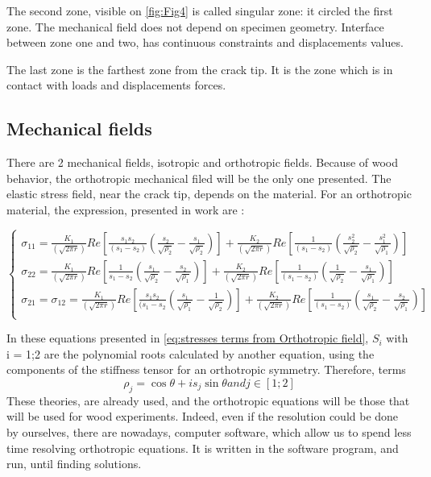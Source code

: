 The second zone, visible on \ref{fig:Fig4} is called singular zone: it circled the first zone. The mechanical field does not depend on specimen geometry. Interface between zone one and two, has continuous constraints and displacements values.

The last zone is the farthest zone from the crack tip. It is the zone which is in contact with loads and displacements forces.

\subsection{Mechanical fields}
There are 2 mechanical fields, isotropic and orthotropic fields. Because of wood behavior, the orthotropic mechanical filed will be the only one presented. 
The elastic stress field, near the crack tip, depends on the material. For an orthotropic material, the expression, presented in \parencite{Reference10} work are :

\begin{equation}
	\left\{
	\begin{array}{rcr}
		\sigma_{11}=\frac{K_{1}}{(\sqrt{2 \pi r})}Re[\frac{s_{1}s_{2}}{(s_{1}-s_{2})}(\frac{s_{2}}{\sqrt{\rho_{2}}}-\frac{s_{1}}{\sqrt{\rho_{2}}})]+\frac{K_{2}}{(\sqrt{2 \pi r})}Re[\frac{1}{(s_{1}-s_{2})}(\frac{s_{2}^{2}}{\sqrt{\rho_{2}}}-\frac{s_{1}^{2}}{\sqrt{\rho_{1}}})]\\
		\sigma_{22}=\frac{K_{1}}{(\sqrt{2 \pi r})}Re[\frac{1}{s_{1}-s_{2}}(\frac{s_{1}}{\sqrt{\rho_{2}}}-\frac{s_{2}}{\sqrt{\rho_{1}}})]+\frac{K_{2}}{(\sqrt{2 \pi r})}Re[\frac{1}{(s_{1}-s_{2})}(\frac{1}{\sqrt{\rho_{2}}}-\frac{s_{1}}{\sqrt{\rho_{1}}})]\\
		\sigma_{21}=\sigma_{12}=\frac{K_{1}}{(\sqrt{2 \pi r})}Re[\frac{s_{1}s_{2}}{(s_{1}-s_{2}}(\frac{s_{1}}{\sqrt{\rho_{1}}}-\frac{1}{\sqrt{\rho_{2}}})]+\frac{K_{2}}{(\sqrt{ 2\pi r})}Re[\frac{1}{(s_{1}-s_{2})}(\frac{s_{1}}{\sqrt{\rho_{2}}}-\frac{s_{2}}{\sqrt{\rho_{1}}})] \\
	\end{array}
	\right.			
	\label{eq:stresses terms from Orthotropic field}
\end{equation} 

In these equations presented in \ref{eq:stresses terms from Orthotropic field}, $S_{i}$ with i = {1;2} are the polynomial roots calculated by another equation, using the components of the stiffness tensor for an orthotropic symmetry. 
Therefore, terms
\begin{equation}	
	\rho_{j}=\cos{\theta}+i s_{j} \sin{\theta} and j\in{[1;2]}
	\label{eq:terms present in stress equations}
\end{equation}			
These theories, are already used, and the orthotropic equations will be those that will be used for wood experiments. Indeed, even if the resolution could be done by ourselves, there are nowadays, computer software, which allow us to spend less time resolving orthotropic equations. It is written in the software program, and run, until finding solutions.

